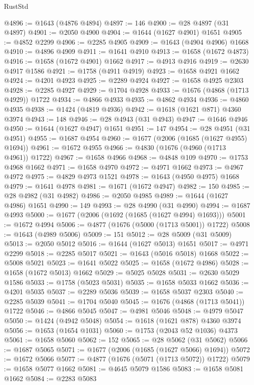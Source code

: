\begin{lexlean}{RustStd}
\begin{coremodule}
@4896 := @1643 (@4876 @4894)
@4897 := 146
@4900 := @28 @4897 (@31 @4897)
@4901 := @2050 @4900
@4904 := @1644 (@1627 @4901) @1651
@4905 := @4852 @2299
@4906 := @2285 @4905
@4909 := @1643 (@4904 @4906) @1668
@4910 := @4896 @4909
@4911 := @1641 @4910
@4913 := @1658 (@1672 @4873)
@4916 := @1658 (@1672 @4901) @1662
@4917 := @4913 @4916
@4919 := @2630 @4917 @1586
@4921 := @1758 (@4911 @4919)
@4923 := @1658 @4921 @1662
@4924 := @4201 @4923
@4925 := @2289 @4924
@4927 := @1658 @4925 @2303
@4928 := @2285 @4927
@4929 := @1704 @4928
@4933 := @1676 (@4868 (@1713 @4929)) @1722
@4934 := @4866 @4933
@4935 := @4862 @4934
@4936 := @4860 @4935
@4938 := @1424 (@4819 @4936)
@4942 := @1618 (@1621 @871) @4360 @3974
@4943 := 148
@4946 := @28 @4943 (@31 @4943)
@4947 := @1646 @4946
@4950 := @1644 (@1627 @4947) @1651
@4951 := 147
@4954 := @28 @4951 (@31 @4951)
@4955 := @1687 @4954
@4960 := @1677 (@2006 (@1685 (@1627 @4955) @1694))
@4961 := @1672 @4955
@4966 := @4830 (@1676 (@4960 (@1713 @4961)) @1722)
@4967 := @1658 @4966
@4968 := @4848 @109
@4970 := @1753 @4968 @1662
@4971 := @1658 @4970
@4972 := @4971 @1662
@4973 := @4967 @4972
@4975 := @4829 @4973 @1521
@4978 := @1643 (@4950 @4975) @1668
@4979 := @1641 @4978
@4981 := @1671 (@1672 @4947)
@4982 := 150
@4985 := @28 @4982 (@31 @4982)
@4986 := @2050 @4985
@4989 := @1644 (@1627 @4986) @1651
@4990 := 149
@4993 := @28 @4990 (@31 @4990)
@4994 := @1687 @4993
@5000 := @1677 (@2006 (@1692 (@1685 (@1627 @4994) @1693)))
@5001 := @1672 @4994
@5006 := @4877 (@1676 (@5000 (@1713 @5001)) @1722)
@5008 := @1643 (@4989 @5006)
@5009 := 151
@5012 := @28 @5009 (@31 @5009)
@5013 := @2050 @5012
@5016 := @1644 (@1627 @5013) @1651
@5017 := @4971 @2299
@5018 := @2285 @5017
@5021 := @1643 (@5016 @5018) @1668
@5022 := @5008 @5021
@5023 := @1641 @5022
@5025 := @1658 (@1672 @4986)
@5028 := @1658 (@1672 @5013) @1662
@5029 := @5025 @5028
@5031 := @2630 @5029 @1586
@5033 := @1758 (@5023 @5031)
@5035 := @1658 @5033 @1662
@5036 := @4201 @5035
@5037 := @2289 @5036
@5039 := @1658 @5037 @2303
@5040 := @2285 @5039
@5041 := @1704 @5040
@5045 := @1676 (@4868 (@1713 @5041)) @1722
@5046 := @4866 @5045
@5047 := @4981 @5046
@5048 := @4979 @5047
@5050 := @1424 (@4942 @5048)
@5054 := @1618 (@1621 @878) @4360 @3974
@5056 := @1653 (@1654 @1031)
@5060 := @1753 (@2043 @52 @1036) @4373
@5061 := @1658 @5060
@5062 := 152
@5065 := @28 @5062 (@31 @5062)
@5066 := @1687 @5065
@5071 := @1677 (@2006 (@1685 (@1627 @5066) @1694))
@5072 := @1672 @5066
@5077 := @4877 (@1676 (@5071 (@1713 @5072)) @1722)
@5079 := @1658 @5077 @1662
@5081 := @4645 @5079 @1586
@5083 := @1658 @5081 @1662
@5084 := @2283 @5083

\end{coremodule}
\end{lexlean}
